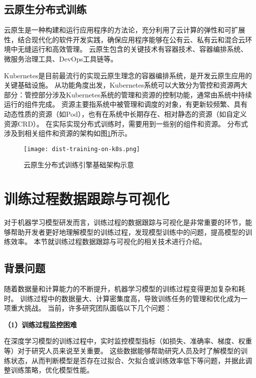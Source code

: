 \subsection{云原生分布式训练}

云原生是一种构建和运行应用程序的方法论，充分利用了云计算的弹性和可扩展性，结合现代化的软件开发实践，确保应用程序能够在公有云、私有云和混合云环境中无缝运行和高效管理。
云原生包含的关键技术有容器技术、容器编排系统、微服务治理工具、DevOps工具链等。

Kubernetes是目前最流行的实现云原生理念的容器编排系统，是开发云原生应用的关键基础设施。
从功能角度出发，Kubernetes系统可以大致分为管控和资源两大部分：管控部分涉及Kubernetes系统的管理和资源的控制功能，通常由系统中持续运行的组件完成。
资源主要指系统中被管理和调度的对象，有更新较频繁、具有动态性质的资源（如Pod），也有在系统中长期存在、相对静态的资源（如自定义资源CRD）。
在实际实现分布式训练时，需要用到一些别的组件和资源。
分布式涉及到相关组件和资源的架构如图\ref{fig:disttrainingk8s}所示。

\begin{figure}
  \centering
  \texttt{[image: dist-training-on-k8s.png]}
  \caption{云原生分布式训练引擎基础架构示意}
  \label{fig:disttrainingk8s}
\end{figure}


\section{训练过程数据跟踪与可视化}

对于机器学习模型研发而言，训练过程的数据跟踪与可视化是非常重要的环节，能够帮助开发者更好地理解模型的训练过程，发现模型训练中的问题，提高模型的训练效率。
本节就训练过程数据跟踪与可视化的相关技术进行介绍。

\subsection{背景问题}

随着数据量和计算能力的不断提升，机器学习模型的训练过程变得更加复杂和耗时。
训练过程中的数据量大、计算密集度高，导致训练任务的管理和优化成为一项重大挑战。
当前，许多研究团队面临以下几个问题：

\textbf{（1）训练过程监控困难}

在深度学习模型的训练过程中，实时监控模型指标（如损失、准确率、梯度、权重等）对于研究人员来说至关重要。
这些数据能够帮助研究人员及时了解模型的训练状态，从而判断模型是否存在过拟合、欠拟合或训练效率低下等问题，并据此调整训练策略，优化模型性能。

